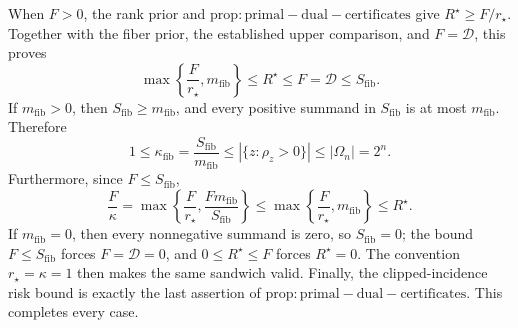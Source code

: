 When \(F>0\), the rank prior and \(\mathrm{prop:primal-dual-certificates}\) give \(R^{\star}\ge F/r_{\star}\). Together with the fiber prior, the established upper comparison, and \(F=\mathcal D\), this proves
\[
 \max\left\{\frac{F}{r_{\star}},m_{\mathrm{fib}}\right\}
 \le R^{\star}\le F=\mathcal D\le S_{\mathrm{fib}}.
\]
If \(m_{\mathrm{fib}}>0\), then \(S_{\mathrm{fib}}\ge m_{\mathrm{fib}}\), and every positive summand in \(S_{\mathrm{fib}}\) is at most \(m_{\mathrm{fib}}\). Therefore
\[
 1\le\kappa_{\mathrm{fib}}
 =\frac{S_{\mathrm{fib}}}{m_{\mathrm{fib}}}
 \le|\{z:\rho_z>0\}|\le|\Omega_n|=2^n.
\]
Furthermore, since \(F\le S_{\mathrm{fib}}\),
\[
 \frac{F}{\kappa}
 =\max\left\{\frac{F}{r_{\star}},
                 \frac{Fm_{\mathrm{fib}}}{S_{\mathrm{fib}}}\right\}
 \le\max\left\{\frac{F}{r_{\star}},m_{\mathrm{fib}}\right\}
 \le R^{\star}.
\]
If \(m_{\mathrm{fib}}=0\), then every nonnegative summand is zero, so \(S_{\mathrm{fib}}=0\); the bound \(F\le S_{\mathrm{fib}}\) forces \(F=\mathcal D=0\), and \(0\le R^{\star}\le F\) forces \(R^{\star}=0\). The convention \(r_{\star}=\kappa=1\) then makes the same sandwich valid. Finally, the clipped-incidence risk bound is exactly the last assertion of \(\mathrm{prop:primal-dual-certificates}\). This completes every case.